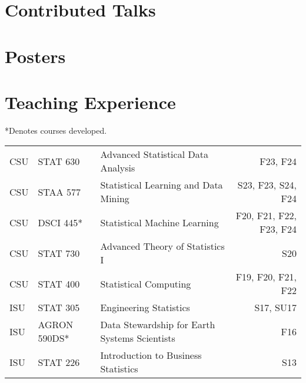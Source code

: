 \documentclass[margin,line]{res}
\begin{document}
\begin{resume}


\section{\sc Contributed Talks}
\printbibliography[keyword=talk-contributed, heading=none, resetnumbers=true]

\section{\sc Posters}
\printbibliography[keyword=poster, heading=none, resetnumbers=true]

\section{\sc Teaching Experience}
*Denotes courses developed.\\

\vspace{-.4cm}

\begin{table}[H]
\begin{tabular}{l l l r}
CSU & STAT 630 & Advanced Statistical Data Analysis & F23, F24 \\
CSU & STAA 577 & Statistical Learning and Data Mining  & S23, F23, S24, F24 \\
CSU & DSCI 445* & Statistical Machine Learning & F20, F21, F22, F23, F24 \\
CSU & STAT 730 & Advanced Theory of Statistics I & S20 \\
CSU & STAT 400 & Statistical Computing & F19, F20, F21, F22 \\
ISU & STAT 305 & Engineering Statistics & S17, SU17 \\
ISU & AGRON 590DS* & Data Stewardship for Earth Systems Scientists & F16 \\
ISU & STAT 226 & Introduction to Business Statistics & S13 \\
\end{tabular}
\end{table}


\end{resume}
\end{document}
